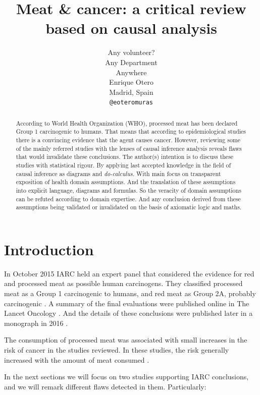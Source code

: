 \documentclass{article}
\title{Meat \& cancer: a critical review based on causal analysis %
}
\author{
  Any volunteer? \\
Any Department\\
  Anywhere\\
   \And
 Enrique Otero \\
  Madrid, Spain\\
  \texttt{@eoteromuras}
}
\begin{document}
\maketitle

\begin{abstract}
According to World Health Organization (WHO), processed meat has been declared Group 1 carcinogenic to humans. That means that according to epidemiological studies there is a convincing evidence that the agent causes cancer. However, reviewing some of the mainly referred studies with the lenses of causal inference analysis reveals %
flaws that would invalidate these conclusions. The author(s) intention is to discuss these studies with statistical rigour. By applying last accepted knowledge in the field of causal inference as diagrams and \textit{do-calculus}. With main focus on transparent exposition of health domain assumptions. And the translation of these assumptions into explicit language, diagrams and formulas. So the veracity of domain assumptions can be refuted according to domain expertise. And any conclusion derived from these assumptions being validated or invalidated on the basis of axiomatic logic and maths.

\end{abstract}




\section{Introduction}
 In October 2015 IARC held an expert panel that considered the evidence for red and processed meat as possible human carcinogens. They classified processed meat as a Group 1 carcinogenic to humans, and red meat as Group 2A, probably carcinogenic \cite{whoint}. A summary of the final evaluations were published online in The Lancet Oncology \cite{lancet}. And the details of these conclusions were published later in a monograph in 2016 \cite{monograph}.

The consumption of processed meat was associated with small increases in the risk of cancer in the studies reviewed. In these studies, the risk generally increased with the amount of meat consumed \cite{whoint}.


In the next sections we will focus on two studies supporting IARC conclusions, and we will remark different flaws detected in them. Particularly:
\end{document}
